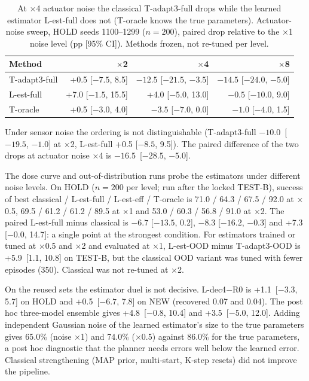 \begin{table}[htbp]
\centering
\caption{At $\times$4 actuator noise the classical T-adapt3-full drops while the learned estimator L-est-full does not (T-oracle knows the true parameters). Actuator-noise sweep, HOLD seeds 1100--1299 ($n{=}200$), paired drop relative to the $\times$1 noise level (pp [95\% CI]). Methods frozen, not re-tuned per level.}
\label{tab:fragility}
\begin{tabular}{@{}lrrr@{}}
\toprule
Method & $\times$2 & $\times$4 & $\times$8 \\ \midrule
T-adapt3-full & +0.5 [$-7.5$, 8.5] & $-12.5$ [$-21.5$, $-3.5$] & $-14.5$ [$-24.0$, $-5.0$] \\
L-est-full & +7.0 [$-1.5$, 15.5] & +4.0 [$-5.0$, 13.0] & $-0.5$ [$-10.0$, 9.0] \\
T-oracle & +0.5 [$-3.0$, 4.0] & $-3.5$ [$-7.0$, 0.0] & $-1.0$ [$-4.0$, 1.5] \\
\bottomrule
\end{tabular}
\end{table}

Under sensor noise the ordering is not distinguishable (T-adapt3-full $-10.0$\pp\ [$-19.5$, $-1.0$] at $\times$2, L-est-full +0.5 [$-8.5$, 9.5]). The paired difference of the two drops at actuator noise $\times$4 is $-16.5$\pp\ [$-28.5$, $-5.0$].

The dose curve and out-of-distribution runs probe the estimators under different noise levels. On HOLD ($n{=}200$ per level; run after the locked TEST-B), success of best classical / L-est-full / L-est-eff / T-oracle is 71.0 / 64.3 / 67.5 / 92.0 at $\times$0.5, 69.5 / 61.2 / 61.2 / 89.5 at $\times$1 and 53.0 / 60.3 / 56.8 / 91.0 at $\times$2. The paired L-est-full minus classical is $-6.7$ [$-13.5$, 0.2], $-8.3$ [$-16.2$, $-0.3$] and +7.3 [$-0.0$, 14.7]: a single point at the strongest condition. For estimators trained or tuned at $\times$0.5 and $\times$2 and evaluated at $\times$1, L-est-OOD minus T-adapt3-OOD is +5.9\pp\ [1.1, 10.8] on TEST-B, but the classical OOD variant was tuned with fewer episodes (350). Classical was not re-tuned at $\times$2.

On the reused sets the estimator duel is not decisive. L-dec4$-$R0 is +1.1\pp\ [$-3.3$, 5.7] on HOLD and +0.5\pp\ [$-6.7$, 7.8] on NEW (recovered 0.07 and 0.04). The post hoc three-model ensemble gives +4.8\pp\ [$-0.8$, 10.4] and +3.5\pp\ [$-5.0$, 12.0]. Adding independent Gaussian noise of the learned estimator's size to the true parameters gives 65.0\% (noise $\times$1) and 74.0\% ($\times$0.5) against 86.0\% for the true parameters, a post hoc diagnostic that the planner needs errors well below the learned error. Classical strengthening (MAP prior, multi-start, K-step resets) did not improve the pipeline.

